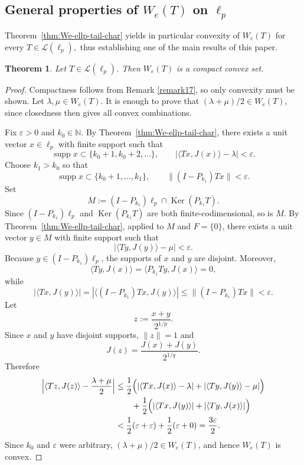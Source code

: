 \documentclass[11pt]{amsart}
\numberwithin{equation}{section}
\newtheorem{theorem}{Theorem}[section]
\theoremstyle{definition}
\theoremstyle{remark}
\DeclareMathOperator{\Ker}{Ker}
\DeclareMathOperator{\supp}{supp}
\newcommand{\N}{\mathbb{N}}
\newcommand{\ip}[2]{\langle #1,#2\rangle}
\newcommand{\We}{W_e}
\begin{document}
\subsection{General properties of $\We(T)$ on $\ell_p$}\label{genpropwe}

Theorem~\ref{thm:We-ellp-tail-char} yields in particular convexity of $W_e(T)$ for every 
$T \in \mathcal L(\ell_p),$ thus establishing one of the main results of this paper.

\begin{theorem}\label{thm:We-ellp-convex}
Let $T\in \mathcal L(\ell_p)$. Then $\We(T)$ is a compact convex set.
\end{theorem}

\begin{proof}
Compactness follows from Remark \ref{remark17},
 so only convexity must be shown.
Let $\lambda,\mu\in \We(T)$. It is enough to prove that $(\lambda+\mu)/2\in \We(T)$, since closedness then gives all convex combinations.

Fix $\varepsilon>0$ and $k_0\in\N$. By Theorem~\ref{thm:We-ellp-tail-char}, there exists a unit vector $x\in\ell_p$ with finite support such that
\[
\supp x\subset\{k_0+1,k_0+2,\dots\},
\qquad
|\ip{Tx}{J(x)}-\lambda|<\varepsilon.
\]
Choose $k_1>k_0$ so that
\[
\supp x\subset\{k_0+1,\dots,k_1\},
\qquad
\|(I-P_{k_1})Tx\|<\varepsilon.
\]
Set
\[
M:=(I-P_{k_1})\ell_p\cap \Ker(P_{k_1}T).
\]
Since $(I-P_{k_1})\ell_p$ and $\Ker(P_{k_1}T)$ are both finite-codimensional, so is $M$.
By Theorem~\ref{thm:We-ellp-tail-char}, applied to $M$ and $F=\{0\}$, there exists a unit vector $y\in M$ with finite support such that
\[
|\ip{Ty}{J(y)}-\mu|<\varepsilon.
\]
Because $y\in (I-P_{k_1})\ell_p$, the supports of $x$ and $y$ are disjoint. Moreover,
\[
\ip{Ty}{J(x)}=\ip{P_{k_1}Ty}{J(x)}=0,
\]
while
\[
|\ip{Tx}{J(y)}|=|\ip{(I-P_{k_1})Tx}{J(y)}|\le \|(I-P_{k_1})Tx\|<\varepsilon.
\]
Let
\[
z:=\frac{x+y}{2^{1/p}}.
\]
Since $x$ and $y$ have disjoint supports, $\|z\|=1$ and
\[
J(z)=\frac{J(x)+J(y)}{2^{1/q}}.
\]
Therefore
\begin{align*}
\Bigl|\ip{Tz}{J(z)}-\frac{\lambda+\mu}{2}\Bigr|
&\le \frac12\Bigl(|\ip{Tx}{J(x)}-\lambda|+|\ip{Ty}{J(y)}-\mu|\Bigr)\\
&\qquad +\frac12\Bigl(|\ip{Tx}{J(y)}|+|\ip{Ty}{J(x)}|\Bigr)\\
&<\frac12(\varepsilon+\varepsilon)+\frac12(\varepsilon+0)=\frac{3\varepsilon}{2}.
\end{align*}
Since $k_0$ and $\varepsilon$ were arbitrary, $(\lambda+\mu)/2\in \We(T)$, and hence $\We(T)$ is convex.
\end{proof}
\end{document}
